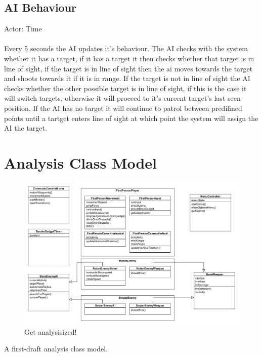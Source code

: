 \documentclass[a4paper,10pt]{article}
\begin{document}
\subsection{AI Behaviour}
Actor: Time\\\\
Every 5 seconds the AI updates it's behaviour. The AI checks with the system whether it has a target, if it has a target it then checks whether that target is in line of sight, if the target is in line of sight then the ai moves towards the target and shoots towards it if it is in range. If the target is not in line of sight the AI checks whether the other possible target is in line of sight, if this is the case it will switch targets, otherwise it will proceed to it's cureent target's last seen position. If the AI has no target it will continue to patrol between predifined points until a tartget enters line of sight at which point the system will assign the AI the target.

\section{Analysis Class Model}
\begin{figure}[H]
	\begin{center}
		\includegraphics[scale=0.4]{images/AnalysisClassDiagram.png}
		\caption{Get analysisized!}
	\end{center}
\end{figure}
A first-draft analysis class model.
\end{document}
